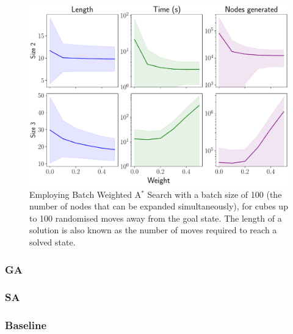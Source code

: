 \documentclass[UKenglish]{libraries/svproc}
\begin{document}
\begin{figure}[!h]
\begin{small}
\centering
\linespread{1.0}
\includegraphics[width=0.75\linewidth]{images/bwas}
\caption{Employing Batch Weighted A$^{\ast}$ Search with a batch size of 100 (the number of nodes that can be expanded simultaneously), for cubes up to 100 randomised moves away from the goal state. The length of a solution is also known as the number of moves required to reach a solved state.}
\label{fig:fig3}
\end{small}
\end{figure}

\subsubsection{GA}


\subsubsection{SA}


\subsubsection{Baseline}
\end{document}

